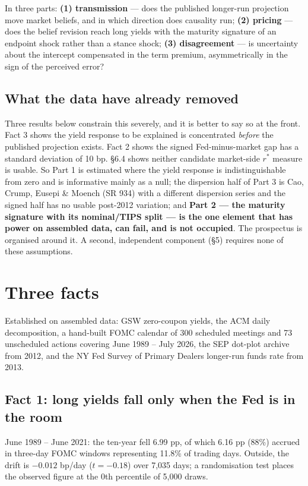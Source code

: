 \documentclass[11pt]{article}
\newcommand{\rs}{$r^{*}$}
\begin{document}
\noindent In three parts: \textbf{(1) transmission} --- does the published longer-run
projection move market beliefs, and in which direction does causality run; \textbf{(2)
pricing} --- does the belief revision reach long yields with the maturity signature of an
endpoint shock rather than a stance shock; \textbf{(3) disagreement} --- is uncertainty about
the intercept compensated in the term premium, asymmetrically in the sign of the perceived
error?

\subsection*{What the data have already removed}

Three results below constrain this severely, and it is better to say so at the front. Fact 3
shows the yield response to be explained is concentrated \emph{before} the published projection
exists. Fact 2 shows the signed Fed-minus-market gap has a standard deviation of 10 bp. \S6.4
shows neither candidate market-side \rs{} measure is usable. So Part 1 is estimated where the
yield response is indistinguishable from zero and is informative mainly as a null; the
dispersion half of Part 3 is Cao, Crump, Eusepi \& Moench (SR 934) with a different dispersion
series and the signed half has no usable post-2012 variation; and \textbf{Part 2 --- the
maturity signature with its nominal/TIPS split --- is the one element that has power on
assembled data, can fail, and is not occupied}. The prospectus is organised around it. A
second, independent component (\S5) requires none of these assumptions.

\section{Three facts}

Established on assembled data: GSW zero-coupon yields, the ACM daily decomposition, a
hand-built FOMC calendar of 300 scheduled meetings and 73 unscheduled actions covering June
1989 -- July 2026, the SEP dot-plot archive from 2012, and the NY Fed Survey of Primary Dealers
longer-run funds rate from 2013.

\subsection{Fact 1: long yields fall only when the Fed is in the room}

June 1989 -- June 2021: the ten-year fell 6.99 pp, of which 6.16 pp (88\%) accrued in three-day
FOMC windows representing 11.8\% of trading days. Outside, the drift is $-0.012$ bp/day
($t=-0.18$) over 7{,}035 days; a randomisation test places the observed figure at the 0th
percentile of 5{,}000 draws.
\end{document}
